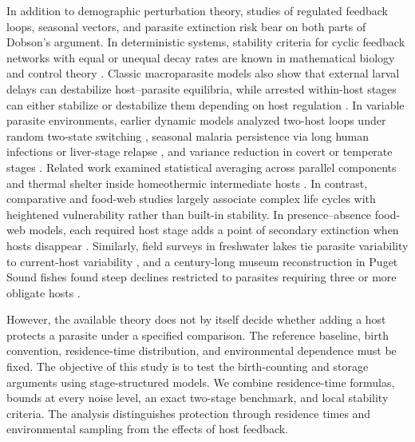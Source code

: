 In addition to demographic perturbation theory, studies of regulated feedback loops, seasonal vectors, and parasite extinction risk bear on both parts of Dobson's argument. In deterministic systems, stability criteria for cyclic feedback networks with equal or unequal decay rates are known in mathematical biology and control theory \citep{blythe1984,lloyd2001,sontag2006,arcak2006,arcak2008,nguyen2009,strelkowa2010}. Classic macroparasite models also show that external larval delays can destabilize host--parasite equilibria, while arrested within-host stages can either stabilize or destabilize them depending on host regulation \citep{anderson1978,may1978,dobson1992,rosa2002,gaba2008,marion2000}. In variable parasite environments, earlier dynamic models analyzed two-host loops under random two-state switching \citep{watts2021}, seasonal malaria persistence via long human infections or liver-stage relapse \citep{smith2007,white2016}, and variance reduction in covert or temperate stages \citep{sorrell2009,maslov2015}. Related work examined statistical averaging across parallel components \citep{doak1998} and thermal shelter inside homeothermic intermediate hosts \citep{molnar2013,kutz2014,aleuy2020}. In contrast, comparative and food-web studies largely associate complex life cycles with heightened vulnerability rather than built-in stability. In presence--absence food-web models, each required host stage adds a point of secondary extinction when hosts disappear \citep{lafferty2009,lafferty2012}. Similarly, field surveys in freshwater lakes tie parasite variability to current-host variability \citep{lagrue2015}, and a century-long museum reconstruction in Puget Sound fishes found steep declines restricted to parasites requiring three or more obligate hosts \citep{wood2023}.

However, the available theory does not by itself decide whether adding a host protects a parasite under a specified comparison. The reference baseline, birth convention, residence-time distribution, and environmental dependence must be fixed. The objective of this study is to test the birth-counting and storage arguments using stage-structured models. We combine residence-time formulas, bounds at every noise level, an exact two-stage benchmark, and local stability criteria. The analysis distinguishes protection through residence times and environmental sampling from the effects of host feedback.


